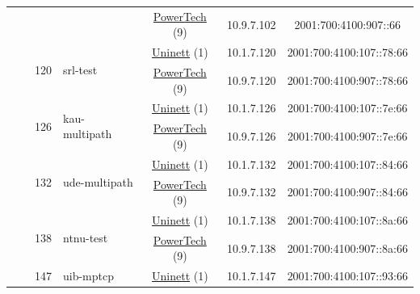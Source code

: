 \begin{small}
\begin{center}
\begin{longtable}{|c|c|c|c|c|c|c|c|}
  &  & \multicolumn{2}{|c|}{} & \multicolumn{2}{|c|}{\tiny{\href{http://www.powertech.no}{PowerTech} (9)}} & \tiny{10.9.7.102} & \tiny{2001:700:4100:907::66} \\* \cline{3-3}\cline{4-4}\cline{5-5}\cline{6-6}\cline{7-7}\cline{8-8}
  &  & \multirow{2}{*}{\tiny{120}} & \multicolumn{1}{|l|}{\multirow{2}{*}{\tiny{srl-test}}} & \multicolumn{2}{|c|}{\tiny{\href{https://www.uninett.no}{Uninett} (1)}} & \tiny{10.1.7.120} & \tiny{2001:700:4100:107::78:66} \\* \cline{5-5}\cline{6-6}\cline{7-7}\cline{8-8}
  &  &  &  & \multicolumn{2}{|c|}{\tiny{\href{http://www.powertech.no}{PowerTech} (9)}} & \tiny{10.9.7.120} & \tiny{2001:700:4100:907::78:66} \\* \cline{3-3}\cline{4-4}\cline{5-5}\cline{6-6}\cline{7-7}\cline{8-8}
  &  & \multirow{2}{*}{\tiny{126}} & \multicolumn{1}{|l|}{\multirow{2}{*}{\tiny{kau-multipath}}} & \multicolumn{2}{|c|}{\tiny{\href{https://www.uninett.no}{Uninett} (1)}} & \tiny{10.1.7.126} & \tiny{2001:700:4100:107::7e:66} \\* \cline{5-5}\cline{6-6}\cline{7-7}\cline{8-8}
  &  &  &  & \multicolumn{2}{|c|}{\tiny{\href{http://www.powertech.no}{PowerTech} (9)}} & \tiny{10.9.7.126} & \tiny{2001:700:4100:907::7e:66} \\* \cline{3-3}\cline{4-4}\cline{5-5}\cline{6-6}\cline{7-7}\cline{8-8}
  &  & \multirow{2}{*}{\tiny{132}} & \multicolumn{1}{|l|}{\multirow{2}{*}{\tiny{ude-multipath}}} & \multicolumn{2}{|c|}{\tiny{\href{https://www.uninett.no}{Uninett} (1)}} & \tiny{10.1.7.132} & \tiny{2001:700:4100:107::84:66} \\* \cline{5-5}\cline{6-6}\cline{7-7}\cline{8-8}
  &  &  &  & \multicolumn{2}{|c|}{\tiny{\href{http://www.powertech.no}{PowerTech} (9)}} & \tiny{10.9.7.132} & \tiny{2001:700:4100:907::84:66} \\* \cline{3-3}\cline{4-4}\cline{5-5}\cline{6-6}\cline{7-7}\cline{8-8}
  &  & \multirow{2}{*}{\tiny{138}} & \multicolumn{1}{|l|}{\multirow{2}{*}{\tiny{ntnu-test}}} & \multicolumn{2}{|c|}{\tiny{\href{https://www.uninett.no}{Uninett} (1)}} & \tiny{10.1.7.138} & \tiny{2001:700:4100:107::8a:66} \\* \cline{5-5}\cline{6-6}\cline{7-7}\cline{8-8}
  &  &  &  & \multicolumn{2}{|c|}{\tiny{\href{http://www.powertech.no}{PowerTech} (9)}} & \tiny{10.9.7.138} & \tiny{2001:700:4100:907::8a:66} \\* \cline{3-3}\cline{4-4}\cline{5-5}\cline{6-6}\cline{7-7}\cline{8-8}
  &  & \multirow{2}{*}{\tiny{147}} & \multicolumn{1}{|l|}{\multirow{2}{*}{\tiny{uib-mptcp}}} & \multicolumn{2}{|c|}{\tiny{\href{https://www.uninett.no}{Uninett} (1)}} & \tiny{10.1.7.147} & \tiny{2001:700:4100:107::93:66} \\* \cline{5-5}\cline{6-6}\cline{7-7}\cline{8-8}

\end{longtable}
\end{center}
\end{small}
